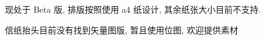 \documentclass[11pt,a4paper]{hfnlletter}
\begin{document}
现处于 Beta 版, 排版按照使用 a4 纸设计, 其余纸张大小目前不支持.

信纸抬头目前没有找到矢量图版, 暂且使用位图, 欢迎提供素材

\lipsum[1-3]
\end{document}
